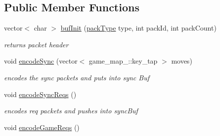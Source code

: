 \subsection*{Public Member Functions}
\begin{DoxyCompactItemize}
\item 
vector$<$ char $>$ \hyperlink{class_network_a94b78a90932755049571742c8ae6d305}{buf\+Init} (\hyperlink{class_network_a95cb88240e7c07871d740c2e19b55aab}{pack\+Type} type, int pack\+Id, int pack\+Count)
\begin{DoxyCompactList}\small\item\em returns packet header \end{DoxyCompactList}\item 
void \hyperlink{class_network_a42c20072f83c7067b17f60d6ba1a9e86}{encode\+Sync} (vector$<$ game\+\_\+map\+\_\+\+::key\+\_\+tap $>$ moves)
\begin{DoxyCompactList}\small\item\em encodes the sync packets and puts into sync Buf \end{DoxyCompactList}\item 
\hypertarget{class_network_a0ebe37571835f8d24a7736085619cc18}{void \hyperlink{class_network_a0ebe37571835f8d24a7736085619cc18}{encode\+Sync\+Reqs} ()}\label{class_network_a0ebe37571835f8d24a7736085619cc18}

\begin{DoxyCompactList}\small\item\em encodes req packets and pushes into sync\+Buf \end{DoxyCompactList}\item 
\hypertarget{class_network_af2dc5f463ed8ad2c2983101332c8a972}{void \hyperlink{class_network_af2dc5f463ed8ad2c2983101332c8a972}{encode\+Game\+Reqs} ()}\label{class_network_af2dc5f463ed8ad2c2983101332c8a972}


\end{DoxyCompactItemize}
